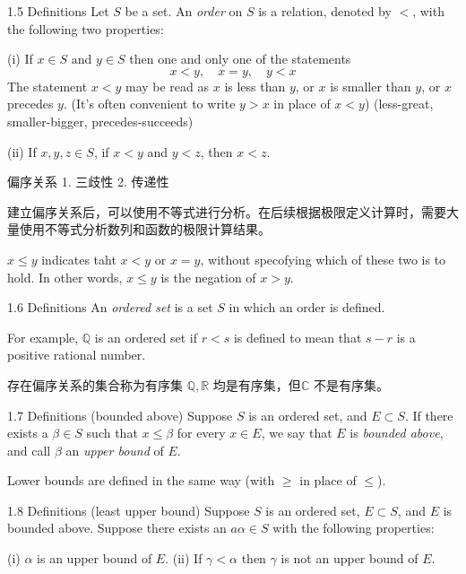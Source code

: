 1.5 Definitions
Let $S$ be a set. An \emph{order} on $S$ is a relation, denoted by $<$, with the following two properties:

(i) If $x\in S$ and $y\in S$ then one and only one of the statements
\begin{equation*}
    x<y, \quad
    x=y, \quad
    y<x
\end{equation*}
The statement $x<y$ may be read as 
$x$ is less than $y$, or 
$x$ is smaller than $y$, or
$x$ precedes $y$.
(It's often convenient to write $y>x$ in place of $x<y$)
(less-great, smaller-bigger, precedes-succeeds)

(ii) If $x,y,z\in S$, if $x<y$ and $y<z$, then $x<z$.

偏序关系
1. 三歧性
2. 传递性

建立偏序关系后，可以使用不等式进行分析。在后续根据极限定义计算时，需要大量使用不等式分析数列和函数的极限计算结果。


$x\leq y$ indicates taht $x<y$ or $x=y$, without specofying which of these two is to hold.
In other words, $x\leq y$ is the negation of $x>y$.

1.6 Definitions
An \emph{ordered set} is a set $S$ in which an order is defined.

For example, $\mathbb{Q}$ is an ordered set if $r<s$ is defined to mean that $s-r$ is a positive rational number.

存在偏序关系的集合称为有序集
$\mathbb{Q}, \mathbb{R}$ 均是有序集，但$\mathbb{C}$ 不是有序集。

1.7 Definitions (bounded above)
Suppose $S$ is an ordered set, and $E \subset S$. If there exists a
$\beta \in S$ such that $x \leq \beta$ for every $x \in E$, we say that $E$ is \emph{bounded above}, and call
$\beta$ an \emph{upper bound} of $E$.

Lower bounds are defined in the same way (with $\geq$ in place of $\leq$).


1.8 Definitions (least upper bound)
Suppose $S$ is an ordered set, $E \subset S$, and $E$ is bounded above.
Suppose there exists an $a\alpha \in S$ with the following properties:

(i) $\alpha$ is an upper bound of $E$.
(ii) If $\gamma <\alpha$ then $\gamma$ is not an upper bound of $E$.

